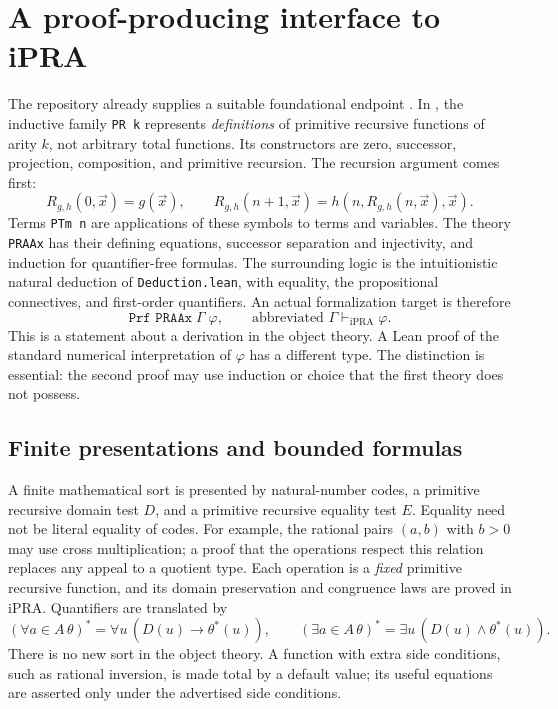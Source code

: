 \section{A proof-producing interface to iPRA}
\label{logic:section}

The repository already supplies a suitable foundational endpoint
\cite{repoCore}.  In
, the inductive family
\texttt{PR k} represents \emph{definitions} of primitive recursive functions
of arity $k$, not arbitrary total functions.  Its constructors are zero,
successor, projection, composition, and primitive recursion.  The recursion
argument comes first:
\[
 R_{g,h}(0,\vec x)=g(\vec x),\qquad
 R_{g,h}(n+1,\vec x)=h(n,R_{g,h}(n,\vec x),\vec x).
\]
Terms \texttt{PTm n} are applications of these symbols to terms and variables.
The theory \texttt{PRAAx} has their defining equations, successor separation
and injectivity, and induction for quantifier-free formulas.  The surrounding
logic is the intuitionistic natural deduction of \texttt{Deduction.lean}, with
equality, the propositional connectives, and first-order quantifiers.
An actual formalization target is therefore
\[
   \texttt{Prf PRAAx}\;\Gamma\;\varphi,
   \qquad\text{abbreviated }\Gamma\vdash_{\mathrm{iPRA}}\varphi.
\]
This is a statement about a derivation in the object theory.  A Lean proof of
the standard numerical interpretation of $\varphi$ has a different type.
The distinction is essential: the second proof may use induction or choice
that the first theory does not possess.

\subsection{Finite presentations and bounded formulas}

A finite mathematical sort is presented by natural-number codes, a primitive
recursive domain test $D$, and a primitive recursive equality test $E$.
Equality need not be literal equality of codes.  For example, the rational
pairs $(a,b)$ with $b>0$ may use cross multiplication; a proof that the
operations respect this relation replaces any appeal to a quotient type.
Each operation is a \emph{fixed} primitive recursive function, and its domain
preservation and congruence laws are proved in iPRA.  Quantifiers are translated
by
\[
 (\forall a\in A\,\theta)^*=
 \forall u\,(D(u)\longrightarrow\theta^*(u)),\qquad
 (\exists a\in A\,\theta)^*=
 \exists u\,(D(u)\wedge\theta^*(u)).
\]
There is no new sort in the object theory.  A function with extra side
conditions, such as rational inversion, is made total by a default value;
its useful equations are asserted only under the advertised side conditions.

